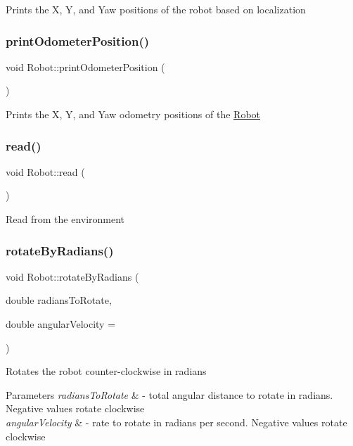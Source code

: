 Prints the X, Y, and Yaw positions of the robot based on localization \mbox{\label{classRobot_a4452b7eccd579684594669b97af8a64a}} 
\subsubsection{\texorpdfstring{print\+Odometer\+Position()}{printOdometerPosition()}}
{\footnotesize\ttfamily void Robot\+::print\+Odometer\+Position (\begin{DoxyParamCaption}{ }\end{DoxyParamCaption})}

Prints the X, Y, and Yaw odometry positions of the \hyperlink{classRobot}{Robot} \mbox{\label{classRobot_a101cfa860e4b67d9f9f4f14a0487a57a}} 
\subsubsection{\texorpdfstring{read()}{read()}}
{\footnotesize\ttfamily void Robot\+::read (\begin{DoxyParamCaption}{ }\end{DoxyParamCaption})}

Read from the environment \mbox{\label{classRobot_a4e139756e0d56b718ff5c19daa7c5f57}} 
\subsubsection{\texorpdfstring{rotate\+By\+Radians()}{rotateByRadians()}}
{\footnotesize\ttfamily void Robot\+::rotate\+By\+Radians (\begin{DoxyParamCaption}\item[{double}]{radians\+To\+Rotate,  }\item[{double}]{angular\+Velocity = {} }\end{DoxyParamCaption})}

Rotates the robot counter-\/clockwise in radians


\begin{DoxyParams}{Parameters}
{\em radians\+To\+Rotate} & -\/ total angular distance to rotate in radians. Negative values rotate clockwise \\
\hline
{\em angular\+Velocity} & -\/ rate to rotate in radians per second. Negative values rotate clockwise \\
\hline
\end{DoxyParams}
\mbox{\label{classRobot_ae59cdda4345c38cff6157f78a417b102}} 
